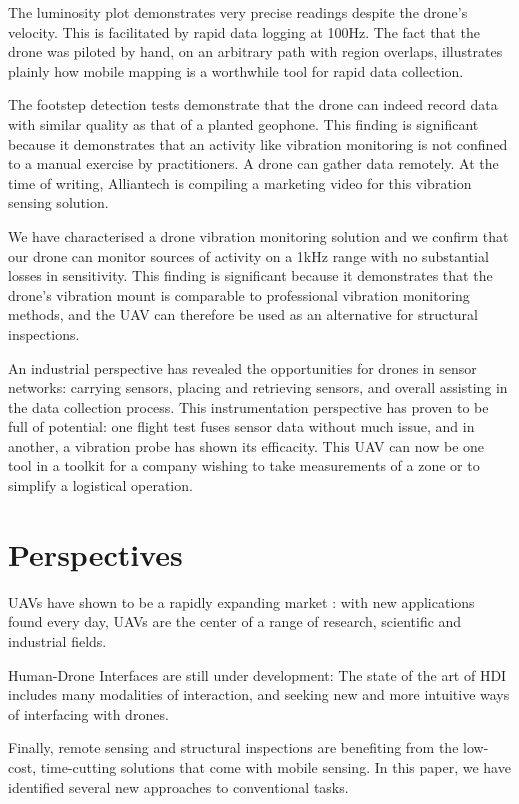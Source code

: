 The luminosity plot demonstrates very precise readings despite the drone's velocity. This is facilitated by rapid data logging at 100Hz. The fact that the drone was piloted by hand, on an arbitrary path with region overlaps, illustrates plainly how mobile mapping is a worthwhile tool for rapid data collection.

The footstep detection tests demonstrate that the drone can indeed record data with similar quality as that of a planted geophone.  This finding is significant because it demonstrates that an activity like vibration monitoring is not confined to a manual exercise by practitioners. A drone can gather data remotely. At the time of writing, Alliantech is compiling a marketing video for this vibration sensing solution.

We have characterised a drone vibration monitoring solution and we confirm that our drone can monitor sources of activity on a 1kHz range with no substantial losses in sensitivity. This finding is significant because it demonstrates that the drone’s vibration mount is comparable to professional vibration monitoring methods, and the UAV can therefore be used as an alternative for structural inspections.

An industrial perspective has revealed the opportunities for drones in sensor networks: carrying sensors, placing and retrieving sensors, and overall assisting in the data collection process. This instrumentation perspective has proven to be full of potential: one flight test fuses sensor data without much issue, and in another, a vibration probe has shown its efficacity. This UAV can now be one tool in a toolkit for a company wishing to take measurements of a zone or to simplify a logistical operation.

\section*{Perspectives}

UAVs have shown to be a rapidly expanding market : with new applications found every day, UAVs are the center of a range of research, scientific and industrial fields.
 
Human-Drone Interfaces are still under development: The state of the art of HDI includes many modalities of interaction, and seeking new and more intuitive ways of interfacing with drones. 

Finally, remote sensing and structural inspections are benefiting from the low-cost, time-cutting solutions that come with mobile sensing. In this paper, we have identified several new approaches to conventional tasks.

    
\printbibliography\label{c4}
 

